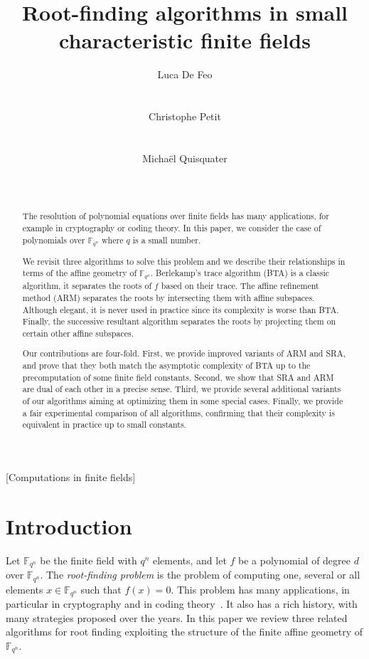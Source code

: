 \documentclass{sig-alternate}
\author{
  \alignauthor Luca De Feo\\
  \affaddr{Laboratoire PRiSM}\\
  \affaddr{Universit\'e de Versailles}\\
  \email{luca.de-feo@uvsq.fr}
  \alignauthor Christophe Petit\\
  \affaddr{Information Security Group}\\
  \affaddr{University College London}\\
  \email{}
  \alignauthor Micha\"el Quisquater\\
  \affaddr{Laboratoire PRiSM}\\
  \affaddr{Universit\'e de Versailles}\\
  \email{mquis@prism.uvsq.fr}
}
\title{Root-finding algorithms in small characteristic finite fields}
\newcommand{\ff}[1]{\mathbb{F}_{#1}}
\newcommand{\fqn}{\ff{q^n}}
\newcommand{\dd}{d}
\newcommand{\qq}{q}
\newcommand{\nn}{n}
\newcommand{\qn}{{\qq^\nn}}
\newcommand{\extf}{\ff{\qn}}
\newcounter{algo}
\begin{document}
\maketitle
\begin{abstract}
  The resolution of polynomial equations over finite fields has many
  applications, for example in cryptography or coding theory.  In this
  paper, we consider the case of polynomials over $\fqn$ where $\qq$
  is a small number.

  We revisit three algorithms to solve this problem and we describe
  their relationships in terms of the affine geometry of $\fqn$.
  Berlekamp's trace algorithm (BTA) is a classic algorithm, it
  separates the roots of $f$ based on their trace. The affine
  refinement method (ARM) separates the roots by intersecting them
  with affine subspaces. Although elegant, it is never used in
  practice since its complexity is worse than BTA. Finally, the
  successive resultant algorithm separates the roots by projecting
  them on certain other affine subspaces.

  Our contributions are four-fold. First, we provide improved variants
  of ARM and SRA, and prove that they both match the asymptotic
  complexity of BTA up to the precomputation of some finite field
  constants.  Second, we show that SRA and ARM are dual of each other
  in a precise sense.  Third, we provide several additional variants
  of our algorithms aiming at optimizing them in some special cases.
  Finally, we provide a fair experimental comparison of all
  algorithms, confirming that their complexity is equivalent in
  practice up to small constants.
\end{abstract}

[Computations in finite fields]


\section{Introduction}

Let $\mathbb{F}_{\qq^\nn}$ be the finite field with $\qq^\nn$ elements, and let $f$ be a polynomial of degree $\dd$ over $\mathbb{F}_{\qq^\nn}$.
%
The \emph{root-finding problem} is the problem of computing one, several or all elements $x\in\mathbb{F}_{\qq^\nn}$ such that $f(x)=0$.
%
This problem has many applications, in particular in cryptography and in coding theory~\cite{McEliece78}. It also has a rich history, with many strategies proposed over the years. In this paper we review three related algorithms for root finding exploiting the structure of the finite affine geometry of $\extf$.
\end{document}
